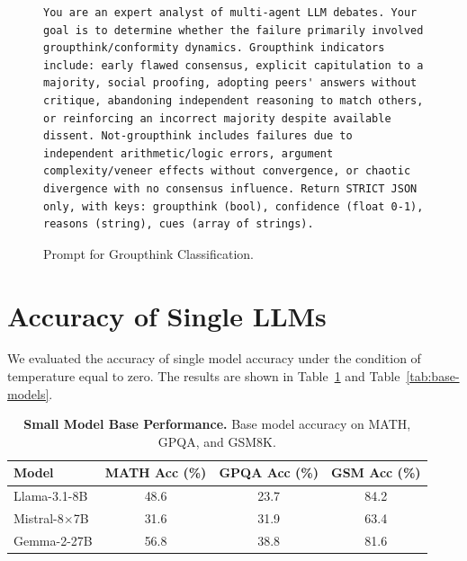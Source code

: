 \begin{figure}[htbp]
  \begin{minipage}{\linewidth}
  \begin{lstlisting}[style=promptstyle]
You are an expert analyst of multi-agent LLM debates. Your goal is to determine whether the failure primarily involved groupthink/conformity dynamics. Groupthink indicators include: early flawed consensus, explicit capitulation to a majority, social proofing, adopting peers' answers without critique, abandoning independent reasoning to match others, or reinforcing an incorrect majority despite available dissent. Not-groupthink includes failures due to independent arithmetic/logic errors, argument complexity/veneer effects without convergence, or chaotic divergence with no consensus influence. Return STRICT JSON only, with keys: groupthink (bool), confidence (float 0-1), reasons (string), cues (array of strings).
\end{lstlisting}
  \end{minipage}
  \caption{Prompt for Groupthink Classification.}
  \label{lst:prompt-groupthink-system}
\end{figure}

\section{Accuracy of Single LLMs}
\label{sec:single-models}
We evaluated the accuracy of single model accuracy under the condition of temperature equal to zero. The results are shown in Table~\ref{tab:base-models-combined} and Table~\ref{tab:base-models}.

\begin{table}[hbtp]
\centering
\begin{tabular}{lccc}
\toprule
\textbf{Model} & \textbf{MATH Acc (\%)} & \textbf{GPQA Acc (\%)} & \textbf{GSM Acc (\%)} \\
\midrule
Llama-3.1-8B         & 48.6 & 23.7 & 84.2 \\
Mistral-8$\times$7B  & 31.6 & 31.9 & 63.4 \\
Gemma-2-27B          & 56.8 & 38.8 & 81.6 \\
\bottomrule
\end{tabular}
\vspace{5pt}
\caption{\textbf{Small Model Base Performance.} Base model accuracy on MATH, GPQA, and GSM8K.}
\label{tab:base-models-combined}
\end{table}


